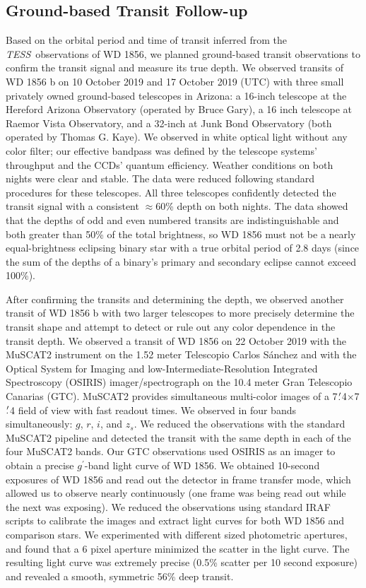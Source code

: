 \documentclass{nature3}
\newcommand*{\bedittwo}{\textcolor{new_black}}
\newcommand{\farcm}{\mbox{\ensuremath{.\mkern-4mu^\prime}}}%
\newcommand{\project}[1]{\textsl{#1}}
\newcommand{\TESS}{\project{TESS}}
\begin{document}
\begin{methods}
\subsection{Ground-based Transit Follow-up}
Based on the orbital period and time of transit inferred from the \TESS\ observations of WD 1856, we planned ground-based transit observations to confirm the transit signal and measure its true depth. We observed transits of WD 1856 b on 10 October 2019 and 17 October 2019 (UTC) with three small privately owned ground-based telescopes in Arizona: a 16-inch telescope at the Hereford Arizona Observatory (operated by Bruce Gary), a 16 inch telescope at Raemor Vista Observatory, and a 32-inch at Junk Bond Observatory (both operated by Thomas G. Kaye). We observed in white optical light without any color filter; our effective bandpass was defined by the telescope systems' throughput and the CCDs' quantum efficiency. Weather conditions on both nights were clear and stable. The data were reduced following standard procedures for these telescopes\cite{rappaport2016}. All three telescopes confidently detected the transit signal with a consistent $\approx$60\% depth on both nights.\bedittwo{ The data showed that the depths of odd and even numbered transits are indistinguishable and both greater than 50\% of the total brightness, so WD 1856 must not be a nearly equal-brightness eclipsing binary star with a true orbital period of 2.8 days (since the sum of the depths of a binary's primary and secondary eclipse cannot exceed 100\%).}

After confirming the transits and determining the depth, we observed another transit of WD 1856 b with two larger telescopes to more precisely determine the transit shape and attempt to detect or rule out any color dependence in the transit depth. We observed a transit of WD 1856 on 22 October 2019 with the MuSCAT2 instrument\cite{muscat2} on the 1.52 meter Telescopio Carlos S\'anchez and with the Optical System for Imaging and low-Intermediate-Resolution Integrated Spectroscopy (OSIRIS) imager/spectrograph on the 10.4 meter Gran Telescopio Canarias (GTC). MuSCAT2 provides simultaneous multi-color images of a 7\farcm4$\times$7\farcm4 field of view with fast readout times. We observed in four bands simultaneously: $g$, $r$, $i$, and $z_s$. We reduced the observations with the standard MuSCAT2 pipeline and detected the transit with the same depth in each of the four MuSCAT2 bands. Our GTC observations used OSIRIS as an imager to obtain a precise $g^\prime$-band light curve of WD 1856. We obtained 10-second exposures of WD 1856 and read out the detector in frame transfer mode, which allowed us to observe nearly continuously (one frame was being read out while the next was exposing). We reduced the observations using standard IRAF scripts to calibrate the images and extract light curves for both WD 1856 and comparison stars. We experimented with different sized photometric apertures, and found that a 6 pixel aperture minimized the scatter in the light curve. The resulting light curve was extremely precise (0.5\% scatter per 10 second exposure) and revealed a smooth, symmetric 56\% deep transit. 


\end{methods}
\end{document}
